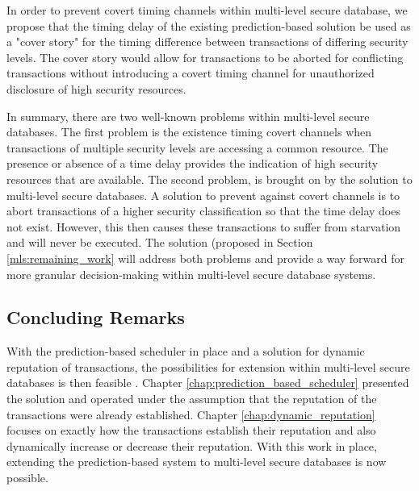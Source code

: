 
In order to prevent covert timing channels within multi-level secure database, we propose that the timing delay of the existing prediction-based solution be used as a "cover story" for the timing difference between transactions of differing security levels. The cover story would allow for transactions to be aborted for conflicting transactions without introducing a covert timing channel for unauthorized disclosure of high security resources.

In summary, there are two well-known problems within multi-level secure databases. The first problem is the existence timing covert channels when transactions of multiple security levels are accessing a common resource. The presence or absence of a time delay provides the indication of high security resources that are available. The second problem, is brought on by the solution to multi-level secure databases. A solution to prevent against covert channels is to abort transactions of a higher security classification so that the time delay does not exist. However, this then causes these transactions to suffer from starvation and will never be executed. The solution (proposed in Section \ref{mls:remaining_work} will address both problems and provide a way forward for more granular decision-making within multi-level secure database systems.

\subsection{Concluding Remarks}
With the prediction-based scheduler in place and a solution for dynamic reputation of transactions, the possibilities for extension within multi-level secure databases is then feasible . Chapter \ref{chap:prediction_based_scheduler} presented the solution and operated under the assumption that the reputation of the transactions were already established. Chapter \ref{chap:dynamic_reputation} focuses on exactly how the transactions establish their reputation and also dynamically increase or decrease their reputation. With this work in place, extending the prediction-based system to multi-level secure databases is now possible.